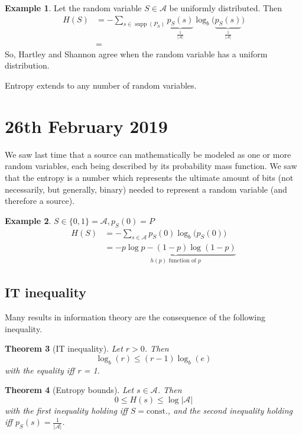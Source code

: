 \documentclass{report}
\DeclareMathOperator{\supp}{supp}
\theoremstyle{plain}
\newtheorem{thm}{Theorem}
\theoremstyle{definition}
\newtheorem{exmp}[thm]{Example}
\theoremstyle{remark}
\begin{document}
\begin{exmp} Let the random variable $S \in \mathcal A$ be uniformly distributed. Then
	\begin{align*}
		H(S) &= - \sum_{s \in \supp (P_S)} \underbrace{p_S(s)}_{\frac{1}{|\mathcal A|}} \log_b \bigl( \underbrace{p_S(s)}_{\frac{1}{|\mathcal A|}} \bigr) \\
		&=
	\end{align*}
So, Hartley and Shannon agree when the random variable has a uniform distribution.
\end{exmp}

Entropy extends to any number of random variables.


\section{26th February 2019}
We saw last time that a source can mathematically be modeled as one or more random variables, each being described by its probability mass function. We saw that the entropy is a number which represents the ultimate amount of bits (not necessarily, but generally, binary) needed to represent a random variable (and therefore a source).
\begin{exmp}
$S \in \{0, 1\} = \mathcal A, p_S(0) = P$
\begin{align*}
	H(S) &= - \sum_{s \in \mathcal A} p_S(0) \log_b \bigl(p_S(0)\bigr) \\
	&= \underbrace{-p \log p - (1-p) \log(1-p)}_{h(p) \text{ function of $p$}}
\end{align*}
\end{exmp}

\subsection{IT inequality}
Many results in information theory are the consequence of the following inequality.
\begin{thm}[IT inequality]
Let $r > 0$. Then
\begin{equation}
	\log_b(r) \leq (r-1) \log_b (e) %
\end{equation}
with the equality iff r = 1.
\end{thm}

\begin{thm}[Entropy bounds]
Let $s \in \mathcal A$. Then
\begin{equation}
	0 \leq H(s) \leq \log|\mathcal A|
\end{equation}
with the first inequality holding iff $S=\text{const.}$, and the second inequality holding iff $p_S(s)=\frac{1}{|\mathcal A|}$.
\end{thm}
\end{document}
